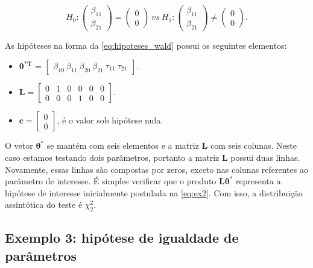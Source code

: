 $$
H_0: 
\begin{pmatrix}
\beta_{11} \\ 
\beta_{21}
\end{pmatrix} 
= 
\begin{pmatrix}
0 \\ 
0
\end{pmatrix}
\ vs \ 
H_1: 
\begin{pmatrix}
\beta_{11} \\ 
\beta_{21}
\end{pmatrix} 
\neq
\begin{pmatrix}
0 \\ 
0 
\end{pmatrix}.
$$

As hipóteses na forma da \autoref{eq:hipoteses_wald} possui os seguintes elementos:

\begin{itemize}
  
  \item $\boldsymbol{\theta^{*T}}$ = $\begin{bmatrix} \beta_{10} \  \beta_{11} \ \beta_{20} \ \beta_{21} \ \tau_{11} \ \tau_{21} \end{bmatrix}$.


\item $\boldsymbol{L} = \begin{bmatrix} 0 & 1 & 0 & 0 & 0 & 0 \\
0 & 0 & 0 & 1 & 0 & 0 \end{bmatrix}.$
 
\item $\boldsymbol{c} = \begin{bmatrix} 0 \\ 0 \end{bmatrix}$, é o valor sob hipótese nula. 

\end{itemize}

O vetor $\boldsymbol{\theta^{*}}$ se mantém com seis elementos e a matriz $\boldsymbol{L}$ com seis colunas. Neste caso estamos testando dois parâmetros, portanto a matriz $\boldsymbol{L}$ possui duas linhas. Novamente, essas linhas são compostas por zeros, exceto nas colunas referentes ao parâmetro de interesse. É simples verificar que o produto $\boldsymbol{L}\boldsymbol{\theta^{*}}$ representa a hipótese de interesse inicialmente postulada na \autoref{eq:ex2}. Com isso, a distribuição assintótica do teste é $\chi^2_2$.

\subsection{Exemplo 3: hipótese de igualdade de parâmetros}

